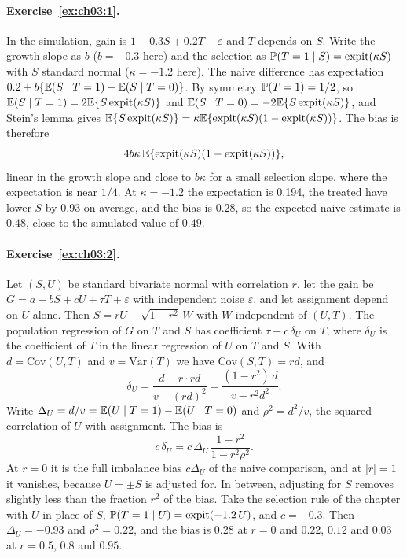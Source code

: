 \paragraph{Exercise~\ref{ex:ch03:1}.} In the simulation, gain is $1 - 0.3S + 0.2T + \varepsilon$ and $T$ depends on $S$. Write the growth slope as $b$ ($b = -0.3$ here) and the selection as $\mathbb{P}(T = 1 \mid S) = \operatorname{expit}(\kappa S)$ with $S$ standard normal ($\kappa = -1.2$ here). The naive difference has expectation $0.2 + b\{\mathbb{E}(S \mid T = 1) - \mathbb{E}(S \mid T = 0)\}$. By symmetry $\mathbb{P}(T = 1) = 1/2$, so $\mathbb{E}(S \mid T = 1) = 2\mathbb{E}\{S\operatorname{expit}(\kappa S)\}$ and $\mathbb{E}(S \mid T = 0) = -2\mathbb{E}\{S\operatorname{expit}(\kappa S)\}$, and Stein's lemma gives $\mathbb{E}\{S\operatorname{expit}(\kappa S)\} = \kappa\mathbb{E}\{\operatorname{expit}(\kappa S)(1 - \operatorname{expit}(\kappa S))\}$. The bias is therefore
\[
4b\kappa\,\mathbb{E}\{\operatorname{expit}(\kappa S)(1 - \operatorname{expit}(\kappa S))\},
\]
linear in the growth slope and close to $b\kappa$ for a small selection slope, where the expectation is near $1/4$. At $\kappa = -1.2$ the expectation is 0.194, the treated have lower $S$ by 0.93 on average, and the bias is $0.28$, so the expected naive estimate is $0.48$, close to the simulated value of $0.49$.

\paragraph{Exercise~\ref{ex:ch03:2}.} Let $(S, U)$ be standard bivariate normal with correlation $r$, let the gain be $G = a + bS + cU + \tau T + \varepsilon$ with independent noise $\varepsilon$, and let assignment depend on $U$ alone. Then $S = rU + \sqrt{1 - r^2}\,W$ with $W$ independent of $(U, T)$. The population regression of $G$ on $T$ and $S$ has coefficient $\tau + c\,\delta_U$ on $T$, where $\delta_U$ is the coefficient of $T$ in the linear regression of $U$ on $T$ and $S$. With $d = \mathrm{Cov}(U, T)$ and $v = \mathrm{Var}(T)$ we have $\mathrm{Cov}(S, T) = rd$, and
\[
\delta_U = \frac{d - r\cdot rd}{v - (rd)^2} = \frac{(1 - r^2)\,d}{v - r^2d^2}.
\]
Write $\Delta_U = d/v = \mathbb{E}(U \mid T = 1) - \mathbb{E}(U \mid T = 0)$ and $\rho^2 = d^2/v$, the squared correlation of $U$ with assignment. The bias is
\[
c\,\delta_U = c\,\Delta_U\,\frac{1 - r^2}{1 - r^2\rho^2}.
\]
At $r = 0$ it is the full imbalance bias $c\Delta_U$ of the naive comparison, and at $|r| = 1$ it vanishes, because $U = \pm S$ is adjusted for. In between, adjusting for $S$ removes slightly less than the fraction $r^2$ of the bias. Take the selection rule of the chapter with $U$ in place of $S$, $\mathbb{P}(T = 1 \mid U) = \operatorname{expit}(-1.2\,U)$, and $c = -0.3$. Then $\Delta_U = -0.93$ and $\rho^2 = 0.22$, and the bias is $0.28$ at $r = 0$ and $0.22$, $0.12$ and $0.03$ at $r = 0.5$, $0.8$ and $0.95$.


